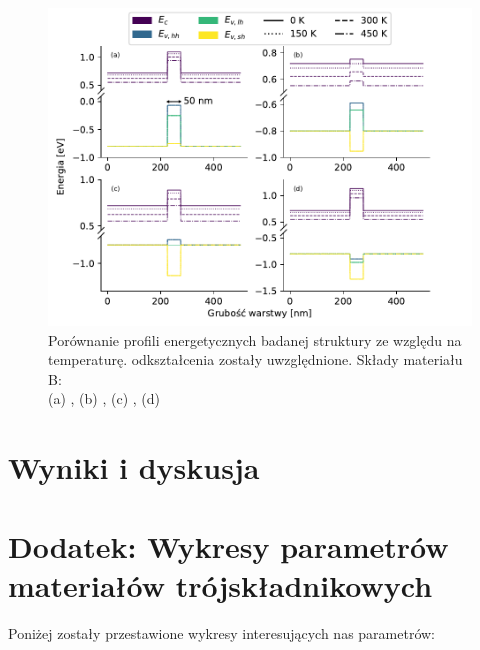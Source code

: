 \documentclass[12pt,openany,a4paper]{book}
\begin{document}
\begin{figure}[H]
	\centering
	\includegraphics[width = 1\linewidth]{Figures/structure/temp_strain.pdf}
	\caption{Porównanie profili energetycznych badanej struktury ze względu na
	temperaturę. odkształcenia zostały uwzględnione.
	Składy materiału B: \\(a) ,
	(b) , (c) ,
	(d) }\label{fig:strain_temp}
\end{figure}




\chapter{Wyniki i dyskusja}\label{chapt:results}


\chapter*{Dodatek: Wykresy parametrów materiałów trójskładnikowych}\label{chapt:dodatek}
Poniżej zostały przestawione wykresy interesujących nas parametrów:
\end{document}
